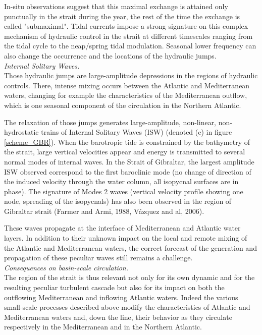 \documentclass[a4paper,12pt]{article}
\begin{document}
In-situ observations suggest that this maximal exchange is attained only punctually in the strait during the year, the rest of the time the exchange is called "submaximal". Tidal currents impose a strong signature on this complex mechanism of hydraulic control in the strait at different timescales ranging from the tidal cycle to the neap/spring tidal modulation. Seasonal lower frequency can also change the occurrence and the locations of the hydraulic jumps.\\

\textit{Internal Solitary Waves.}\\
Those hydraulic jumps are large-amplitude depressions in the regions of hydraulic controls. There, intense mixing occurs between the Atlantic and Mediterranean waters, changing for example the characteristics of the Mediterranean outflow, which is one seasonal component of the circulation in the Northern Atlantic. 

The relaxation of those jumps generates large-amplitude, non-linear, non-hydrostatic trains of Internal Solitary Waves (ISW) (denoted (c) in figure \ref{scheme_GBR}). When the barotropic tide is constrained by the bathymetry of the strait, large vertical velocities appear and energy is transmitted to several normal modes of internal waves. In the Strait of Gibraltar, the largest amplitude ISW observed correspond to the first baroclinic mode (no change of direction of the induced velocity through the water column, all isopycnal surfaces are in phase). The signature of Modes 2 waves (vertical velocity profile showing one node, spreading of the isopycnals) has also been observed in the region of Gibraltar strait (Farmer and Armi, 1988, V\'azquez and al, 2006).

These waves propagate at the interface of Mediterranean and Atlantic water layers. In addition to their unknown impact on the local and remote mixing of the Atlantic and Mediterranean waters, the correct forecast of the generation and propagation of these peculiar waves still remains a challenge. \\

\textit{Consequences on basin-scale circulation.}\\
The region of the strait is thus relevant not only for its own dynamic and for the resulting peculiar turbulent cascade but also for its impact on both the outflowing Mediterranean and inflowing Atlantic waters. Indeed the various small-scale processes described above modify the characteristics of Atlantic and Mediterranean waters and, down the line, their behavior as they circulate respectively in the Mediterranean and in the Northern Atlantic.
\end{document}

